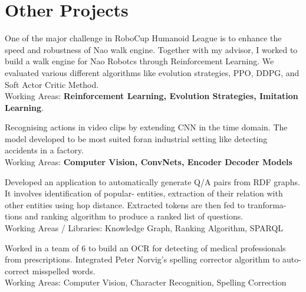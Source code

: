 \documentclass[]{deedy-resume-openfont}
\begin{document}
\section{Other Projects}

One of the major challenge in RoboCup Humanoid League is to enhance the speed and robustness of Nao walk engine. Together with my advisor,
I worked to build a walk engine for Nao Robotcs through Reinforcement Learning. We evaluated various different algorithms like evolution strategies, PPO, DDPG, and Soft Actor Critic Method. \\
Working Areas: \textbf{Reinforcement Learning, Evolution Strategies, Imitation Learning}.
\sectionsep

Recognising actions in video clips by extending CNN in the time domain. The model developed to be most suited foran
industrial setting like detecting accidents in a factory. \\
Working Areas: \textbf{Computer Vision, ConvNets, Encoder Decoder Models}
\sectionsep

Developed an application to automatically generate Q/A pairs from RDF graphs. It involves identification of popular-
entities, extraction of their relation with other entities using hop distance. Extracted tokens are then fed to tranforma-
tions and ranking algorithm to produce a ranked list of questions. \\
Working Areas / Libraries: Knowledge Graph, Ranking Algorithm, SPARQL
\sectionsep

Worked in a team of 6 to build an OCR for detecting of medical professionals from prescriptions. Integrated Peter
Norvig’s spelling corrector algorithm to auto-correct misspelled words. \\
Working Areas: Computer Vision, Character Recognition, Spelling Correction
\sectionsep
\end{document}
